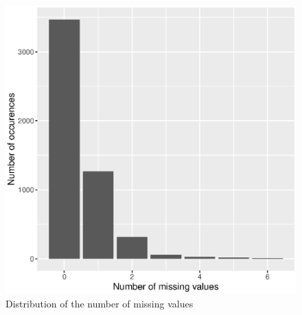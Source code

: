 \begin{figure}[H]
	\centering
   \includegraphics[scale=0.6]{Resources/n_miss}
   \caption{Distribution of the number of missing values}
   \label{fig.n_miss}
\end{figure}